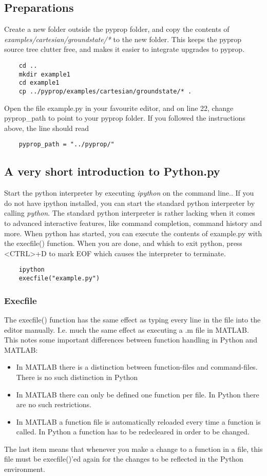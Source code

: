 \documentclass[a4paper,12pt]{report}
\begin{document}
\subsection{Preparations}
Create a new folder outside the pyprop folder, and copy the contents of \textit{examples/cartesian/groundstate/*} to
the new folder. This keeps the pyprop source tree clutter free, and makes it easier to integrate upgrades to pyprop.
\begin{verbatim}
	cd ..
	mkdir example1
	cd example1
	cp ../pyprop/examples/cartesian/groundstate/* .
\end{verbatim}
Open the file example.py in your favourite editor, and on line 22, change pyprop\_path to point to your pyprop folder.
If you followed the instructions above, the line should read
\begin{verbatim}
	pyprop_path = "../pyprop/"
\end{verbatim}

\subsection{A very short introduction to Python.py}
Start the python interpreter by executing \textit{ipython} on the command line.. If you do not have ipython installed, 
you can start the standard python interpreter by calling \textit{python}. The standard python 
interpreter is rather lacking when it comes to advanced interactive features, like command completion, command history and more. When python has started, you can execute the contents of example.py with the execfile() function. When you are done, 
and whish to exit python, press <CTRL>+D to mark EOF which causes the interpreter to terminate.
\begin{verbatim}
	ipython
	execfile("example.py")
\end{verbatim}

\subsubsection*{Execfile}
The execfile() function has the same effect as typing every line in the file into the editor manually. I.e. much the 
same effect as executing a .m file in MATLAB. This notes some important differences between function handling in 
Python and MATLAB:
\begin{itemize}
\item In MATLAB there is a distinction between function-files and command-files. There is no such distinction in Python
\item In MATLAB there can only be defined one function per file. In Python there are no such restrictions.
\item In MATLAB a function file is automatically reloaded every time a function is called. In Python a function has to
be redecleared in order to be changed. 
\end{itemize}
The last item means that whenever you make a change to a function in a file, this file must be execfile()'ed again for the
changes to be reflected in the Python environment.
\end{document}

